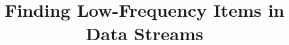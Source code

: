 \documentclass[conference]{IEEEtran}
\begin{document}
%
\title{Finding Low-Frequency Items in Data Streams}




% 








\maketitle
\end{document}
